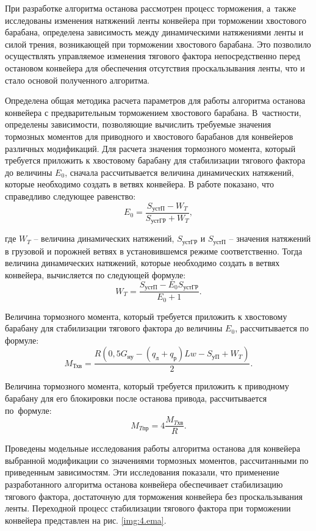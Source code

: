При разработке алгоритма останова рассмотрен процесс торможения, а~также исследованы изменения натяжений ленты конвейера при торможении хвостового барабана, определена зависимость между динамическими натяжениями ленты и силой трения, возникающей при торможении хвостового барабана. Это позволило осуществлять управляемое изменения тягового фактора непосредственно перед остановом конвейера для обеспечения отсутствия проскальзывания ленты, что и стало основой полученного алгоритма. 

Определена общая методика расчета параметров для работы алгоритма останова конвейера с предварительным торможением хвостового барабана. В~частности, определены зависимости, позволяющие вычислить требуемые значения тормозных моментов для приводного и хвостового барабанов для конвейеров различных модификаций. Для расчета значения тормозного момента, который требуется приложить к хвостовому барабану для стабилизации тягового фактора до величины $ E_0 $, сначала рассчитывается величина динамических натяжений, которые необходимо создать в ветвях конвейера. В работе показано, что справедливо следующее равенство:
$$ E_0 = \frac{S_\text{устП} - W_T}{S_\text{устГР} + W_T}, $$

где $ W_T $ -- величина динамических натяжений, $ {S_\text{устГР}} $ и $ {S_\text{устП}} $ -- значения натяжений в грузовой и порожней ветвях в установившемся режиме соответственно. Тогда величина динамических натяжений, которые необходимо создать в ветвях конвейера, вычисляется по следующей формуле:
$$
\label{eq:4.5.wt}
W_T = \frac{S_\text{устП} - E_0 S_\text{устГР}}{E_0 + 1}.
$$

Величина тормозного момента, который требуется приложить к хвостовому барабану для стабилизации тягового фактора до величины $ E_0 $, рассчитывается по формуле:
$$
\label{eq:4.5.mtail}
M_{\text{Тхв}} = \frac{R(0,5G_{\text{ну}} - (q_{\text{л}} + q_{\text{р}})Lw - S_\text{уП} + W_T)}{2}.
$$

Величина тормозного момента, который требуется приложить к приводному барабану для его блокировки после останова привода, рассчитывается по~формуле:
$$
\label{eq:4.5.mdrive}
M_{T \text{пр}} = 4\frac{M_{T\text{хв}}}{R}.
$$

Проведены модельные исследования работы алгоритма останова для конвейера выбранной модификации со значениями тормозных моментов, рассчитанными по приведенным зависимостям. Эти исследования показали, что применение разработанного алгоритма останова конвейера обеспечивает стабилизацию тягового фактора, достаточную для торможения конвейера без проскальзывания ленты. Переходной процесс стабилизации тягового фактора при торможении конвейера представлен на рис. \ref{img:4.ema}.

